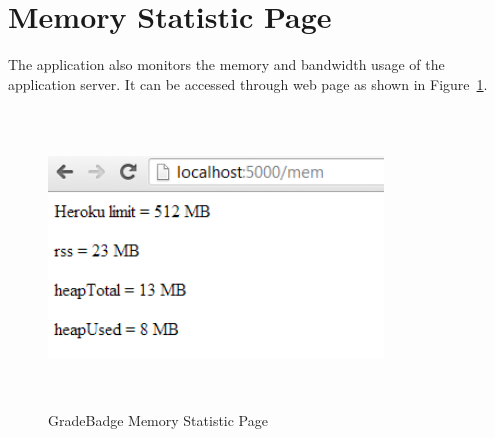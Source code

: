 \newpage
\section{Memory Statistic Page}
The application also monitors the memory and bandwidth usage of the application server. It can be accessed through web page as shown in Figure~\ref{fig:mem}. 

\vspace{3em}
\begin{figure}[H]
\begin{center}
\includegraphics[height=3.1in,width=3.5in]{images/mem.png}
\caption{GradeBadge Memory Statistic Page}
\label{fig:mem}
\end{center}
\end{figure}



